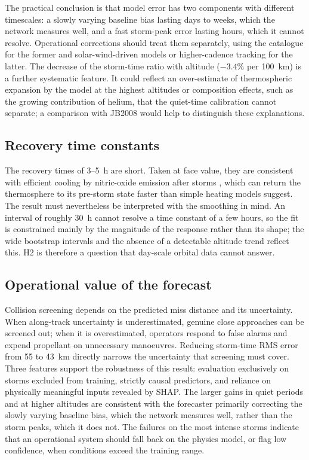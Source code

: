 \documentclass[11pt]{article}
\begin{document}
The practical conclusion is that model error has two components with different timescales: a slowly varying baseline bias lasting days to weeks, which the network measures well, and a fast storm-peak error lasting hours, which it cannot resolve. Operational corrections should treat them separately, using the catalogue for the former and solar-wind-driven models or higher-cadence tracking for the latter. The decrease of the storm-time ratio with altitude ($-3.4$\% per 100~km) is a further systematic feature. It could reflect an over-estimate of thermospheric expansion by the model at the highest altitudes or composition effects, such as the growing contribution of helium, that the quiet-time calibration cannot separate; a comparison with JB2008 would help to distinguish these explanations.

\subsection{Recovery time constants}
The recovery times of 3--5~h are short. Taken at face value, they are consistent with efficient cooling by nitric-oxide emission after storms \citep{mlynczak2003}, which can return the thermosphere to its pre-storm state faster than simple heating models suggest. The result must nevertheless be interpreted with the smoothing in mind. An interval of roughly 30~h cannot resolve a time constant of a few hours, so the fit is constrained mainly by the magnitude of the response rather than its shape; the wide bootstrap intervals and the absence of a detectable altitude trend reflect this. H2 is therefore a question that day-scale orbital data cannot answer.

\subsection{Operational value of the forecast}
Collision screening depends on the predicted miss distance and its uncertainty. When along-track uncertainty is underestimated, genuine close approaches can be screened out; when it is overestimated, operators respond to false alarms and expend propellant on unnecessary manoeuvres. Reducing storm-time RMS error from 55 to 43~km directly narrows the uncertainty that screening must cover. Three features support the robustness of this result: evaluation exclusively on storms excluded from training, strictly causal predictors, and reliance on physically meaningful inputs revealed by SHAP. The larger gains in quiet periods and at higher altitudes are consistent with the forecaster primarily correcting the slowly varying baseline bias, which the network measures well, rather than the storm peaks, which it does not. The failures on the most intense storms indicate that an operational system should fall back on the physics model, or flag low confidence, when conditions exceed the training range.
\end{document}
